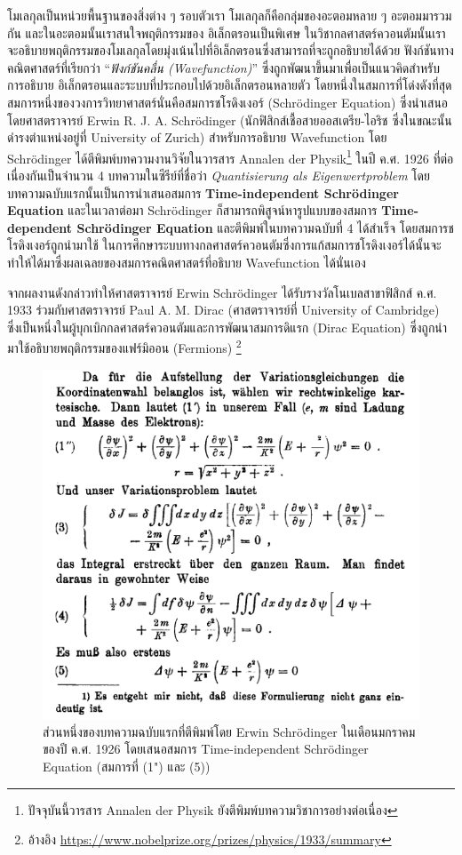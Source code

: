 โมเลกุลเป็นหน่วยพื้นฐานของสิ่งต่าง ๆ รอบตัวเรา โมเลกุลก็คือกลุ่มของอะตอมหลาย ๆ อะตอมมารวมกัน และในอะตอมนั้นเราสนใจพฤติกรรมของ%
อิเล็กตรอนเป็นพิเศษ ในวิชากลศาสตร์ควอนตัมนั้นเราจะอธิบายพฤติกรรมของโมเลกุลโดยมุ่งเน้นไปที่อิเล็กตรอนซึ่งสามารถที่จะถูกอธิบายได้ด้วย%
ฟังก์ชันทางคณิตศาสตร์ที่เรียกว่า \enquote{\textit{ฟังก์ชันคลื่น (Wavefunction)}} ซึ่งถูกพัฒนาขึ้นมาเพื่อเป็นแนวคิดสำหรับการอธิบาย%
อิเล็กตรอนและระบบที่ประกอบไปด้วยอิเล็กตรอนหลายตัว โดยหนึ่งในสมการที่โด่งดังที่สุดสมการหนึ่งของวงการวิทยาศาสตร์นั่นคือสมการชโรดิงเงอร์ 
(Schr\"{o}dinger Equation)\autocite{schleich2013} ซึ่งนำเสนอโดยศาสตราจารย์ Erwin R. J. A. Schr\"{o}dinger 
(นักฟิสิกส์เชื้อสายออสเตรีย-ไอริช ซึ่งในขณะนั้นดำรงตำแหน่งอยู่ที่ University of Zurich) สำหรับการอธิบาย Wavefunction 
โดย Schr\"{o}dinger ได้ตีพิมพ์บทความงานวิจัยในวารสาร Annalen der Physik\footnote{ปัจจุบันนี้วารสาร Annalen der Physik 
ยังตีพิมพ์บทความวิชาการอย่างต่อเนื่อง} ในปี ค.ศ. 1926 ที่ต่อเนื่องกันเป็นจำนวน 4 บทความในซีรีย์ที่ชื่อว่า \textit{Quantisierung als 
Eigenwertproblem} โดยบทความฉบับแรกนั้นเป็นการนำเสนอสมการ \textbf{Time-independent Schr\"{o}dinger Equation}%
\autocite{schrodinger1926} และในเวลาต่อมา Schr\"{o}dinger ก็สามารถพิสูจน์หารูปแบบของสมการ \textbf{Time-dependent 
Schr\"{o}dinger Equation} และตีพิมพ์ในบทความฉบับที่ 4 ได้สำเร็จ\autocite{schrodinger1926a} โดยสมการชโรดิงเงอร์ถูกนำมาใช้%
ในการศึกษาระบบทางกลศาสตร์ควอนตัมซึ่งการแก้สมการชโรดิงเงอร์ได้นั้นจะทำให้ได้มาซึ่งผลเฉลยของสมการคณิตศาสตร์ที่อธิบาย Wavefunction 
ได้นั่นเอง

จากผลงานดังกล่าวทำให้ศาสตราจารย์ Erwin Schr\"{o}dinger ได้รับรางวัลโนเบลสาขาฟิสิกส์ ค.ศ. 1933 ร่วมกับศาสตราจารย์ Paul A. M. 
Dirac (ศาสตราจารย์ที่ University of Cambridge) ซึ่งเป็นหนึ่งในผู้บุกเบิกกลศาสตร์ควอนตัมและการพัฒนาสมการดิแรก (Dirac Equation) 
ซึ่งถูกนำมาใช้อธิบายพฤติกรรมของแฟร์มิออน (Fermions)%
\footnote{อ้างอิง \url{https://www.nobelprize.org/prizes/physics/1933/summary}}

\begin{figure}[htbp]
    \centering
    \includegraphics[width=0.8\linewidth]{fig/time-inde-schrodinger-eq.png}
    \caption{ส่วนหนึ่งของบทความฉบับแรกที่ตีพิมพ์โดย Erwin Schr\"{o}dinger ในเดือนมกราคมของปี ค.ศ. 1926 โดยเสนอสมการ 
    Time-independent Schr\"{o}dinger Equation (สมการที่ (1") และ (5))}
    \label{fig:schrodinger_paper_1}
\end{figure}

